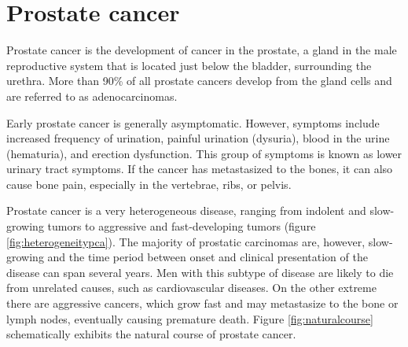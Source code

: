 %

\section{Prostate cancer}

Prostate cancer is the development of cancer in the prostate, a gland in the male reproductive system that is located just below the bladder, surrounding the urethra. More than 90\% of all prostate cancers develop from the gland cells and are referred to as adenocarcinomas.

Early prostate cancer is generally asymptomatic. However, symptoms include increased frequency of urination, painful urination (dysuria), blood in the urine (hematuria), and erection dysfunction. This group of symptoms is known as lower urinary tract symptoms. If the cancer has metastasized to the bones, it can also cause bone pain, especially in the vertebrae, ribs, or pelvis.

Prostate cancer is a very heterogeneous disease, ranging from indolent and slow-growing tumors to aggressive and fast-developing tumors (figure \ref{fig:heterogeneitypca}). The majority of prostatic carcinomas are, however, slow-growing and the time period between onset and clinical presentation of the disease can span several years. Men with this subtype of disease are likely to die from unrelated causes, such as cardiovascular diseases. On the other extreme there are aggressive cancers, which grow fast and may metastasize to the bone or lymph nodes, eventually causing premature death. Figure \ref{fig:naturalcourse} schematically exhibits the natural course of prostate cancer.


